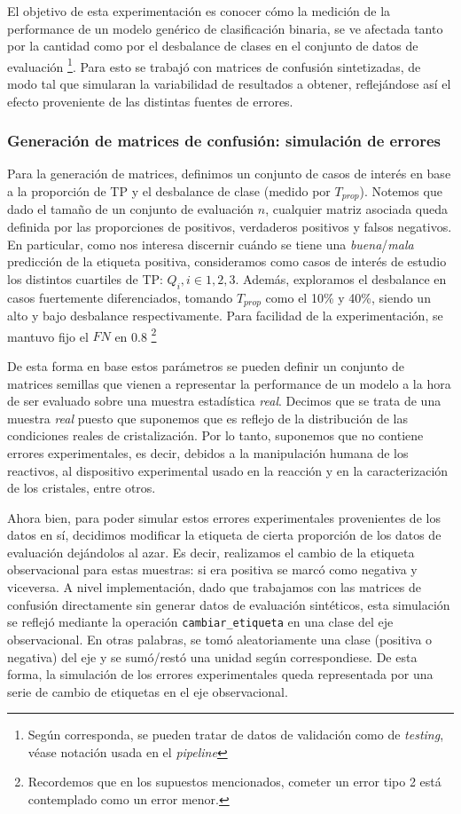 El objetivo de esta experimentación es conocer cómo la medición de la performance de un modelo genérico de clasificación binaria, se ve afectada tanto por la cantidad como por el desbalance de clases en el conjunto de datos de evaluación \footnote{Según corresponda, se pueden tratar de datos de validación como de \textit{testing}, véase notación usada en el \textit{pipeline}}. Para esto se trabajó con matrices de confusión sintetizadas, de modo tal que simularan la variabilidad de resultados a obtener, reflejándose así el efecto proveniente de las distintas fuentes de errores. 

\subsubsection{Generación de matrices de confusión: simulación de errores}

Para la generación de matrices, definimos un conjunto de casos de interés en base a la proporción de TP y el desbalance de clase (medido por $T_{prop}$). Notemos que dado el tamaño de un conjunto de evaluación  $n$, cualquier matriz asociada queda definida por las proporciones de positivos, verdaderos positivos y falsos negativos. En particular, como nos interesa discernir cuándo se tiene una \textit{buena}/\textit{mala} predicción de la etiqueta positiva, consideramos como casos de interés de estudio los distintos cuartiles de TP: $Q_{i}, i \in {1,2,3}$. Además, exploramos el desbalance en casos fuertemente diferenciados, tomando $T_{prop}$ como el 10\% y 40\%, siendo un alto y bajo desbalance respectivamente. Para facilidad de la experimentación, se mantuvo fijo el $FN$ en 0.8 \footnote{Recordemos que en los supuestos mencionados, cometer un error tipo 2 está contemplado como un error menor.}

De esta forma en base estos parámetros se pueden definir un conjunto de matrices semillas que vienen a representar la performance de un modelo a la hora de ser evaluado sobre una muestra estadística \textit{real}. Decimos que se trata de una muestra \textit{real} puesto que suponemos que es reflejo de la distribución de las condiciones reales de cristalización. Por lo tanto, suponemos que no contiene errores experimentales, es decir, debidos a la manipulación humana de los reactivos, al dispositivo experimental usado en la reacción y en la caracterización de los cristales, entre otros.

Ahora bien, para poder simular estos errores experimentales provenientes de los datos en sí, decidimos modificar la etiqueta de cierta proporción de los datos de evaluación dejándolos al azar. Es decir, realizamos el cambio de la etiqueta observacional para estas muestras: si era positiva se marcó como negativa y viceversa. A nivel implementación, dado que trabajamos con las matrices de confusión directamente sin generar datos de evaluación sintéticos, esta simulación se reflejó mediante la operación \texttt{cambiar\_etiqueta} en una clase del eje observacional. En otras palabras, se tomó aleatoriamente una clase (positiva o negativa) del eje y se sumó/restó una unidad según correspondiese. De esta forma, la simulación de los errores experimentales queda representada por una serie de cambio de etiquetas en el eje observacional.

